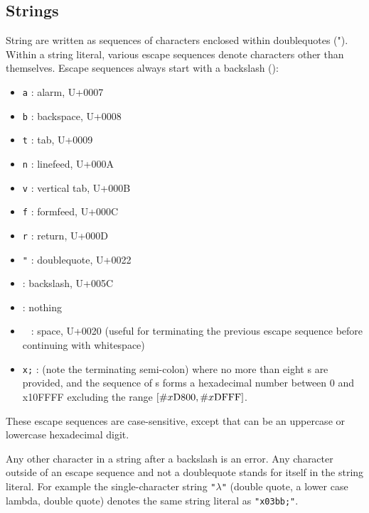 \subsection{Strings}

\vest String are written as sequences of characters enclosed within doublequotes
({\cf "}).  Within a string literal, various escape
sequences denote characters other than
themselves.  Escape sequences always start with a backslash (\backwhack{}):

\begin{itemize}
\item{\tt \backwhack{}a} : alarm, U+0007
\item{\tt \backwhack{}b} : backspace, U+0008 
\item{\tt \backwhack{}t} : tab, U+0009 
\item{\tt \backwhack{}n} : linefeed, U+000A 
\item{\tt \backwhack{}v} : vertical tab, U+000B 
\item{\tt \backwhack{}f} : formfeed, U+000C 
\item{\tt \backwhack{}r} : return, U+000D 
\item{\tt \backwhack{}}\verb|"| : doublequote, U+0022 
\item{\tt \backwhack{}\backwhack{}} : backslash, U+005C 
\item{\tt \backwhack{}} : nothing
\item{\tt \backwhack{}\ } : space, U+0020 (useful for terminating the
  previous escape sequence before continuing with whitespace)
\item{\tt \backwhack{}x;} : (note the
  terminating semi-colon) where no more than eight s
  are provided, and the sequence of s forms a
  hexadecimal number between 0 and \sharpsign{}x10FFFF excluding the
  range $\left[{\tt\#}{}x\textrm{D800},
    {\tt\#}{}x\textrm{DFFF}\right]$.
\end{itemize}

These escape sequences are case-sensitive, except that  can be an uppercase or lowercase hexadecimal digit.

Any other character in a string after a backslash is an error. Any
character outside of an escape sequence and not a doublequote stands
for itself in the string literal. For example the single-character
string {\tt "$\lambda$"} (double quote, a lower case lambda, double
quote) denotes the same string literal as {\tt "\backwhack{}x03bb;"}.

